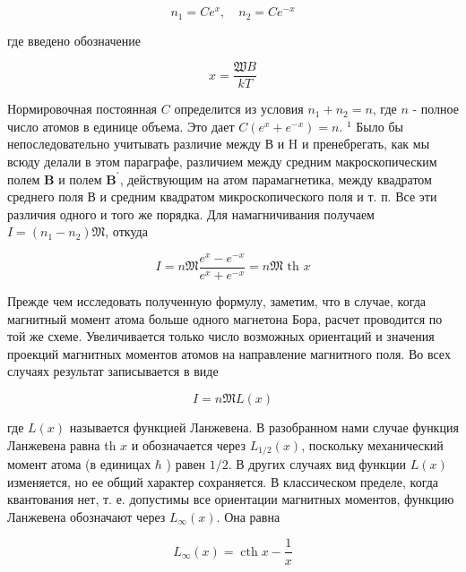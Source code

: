 \documentclass[12pt]{article}
\begin{document}
  \begin{equation}
  n_1=C e^x, \quad n_2=C e^{-x}
  \end{equation}

  где введено обозначение

  \begin{equation}
  x=\frac{\mathfrak{W} B}{k T}
  \end{equation}

  Нормировочная постоянная $C$ определится из условия $n_1+n_2=n$, где $n$ - полное число атомов в единице объема. Это дает $C\left(e^x+e^{-x}\right)=n$.
  ${ }^1$ Было бы непоследовательно учитывать различие между В и H и пренебрегать, как мы всюду делали в этом параграфе, различием между средним макроскопическим полем $\mathbf{B}$ и полем $\mathbf{B}^{\prime}$, действующим на атом парамагнетика, между квадратом среднего поля В и средним квадратом микроскопического поля и т. п. Все эти различия одного и того же порядка.
  Для намагничивания получаем $I=\left(n_1-n_2\right)\mathfrak{M}$, откуда

  \begin{equation}
  \label{eq:quantum}
  I=n \mathfrak{M} \frac{e^x-e^{-x}}{e^x+e^{-x}}=n \mathfrak{M} \text { th } x
  \end{equation}

  Прежде чем исследовать полученную формулу, заметим, что в случае, когда магнитный момент атома больше одного магнетона Бора, расчет проводится по той же схеме. Увеличивается только число возможных ориентаций и значения проекций магнитных моментов атомов на направление магнитного поля. Во всех случаях результат записывается в виде

  \begin{equation}
  I=n \mathfrak{M} L(x)
  \end{equation}

  где $L(x)$ называется функцией Ланжевена. В разобранном нами случае функция Ланжевена равна th $x$ и обозначается через $L_{1 / 2}(x)$, поскольку механический момент атома (в единицах $\hbar$ ) равен $1 / 2$. В других случаях вид функции $L(x)$ изменяется, но ее общий характер сохраняется. В классическом пределе, когда квантования нет, т. е. допустимы все ориентации магнитных моментов, функцию Ланжевена обозначают через $L_{\infty}(x)$. Она равна

  \begin{equation}
  \label{eq:lang}
  L_{\infty}(x)=\operatorname{cth} x-\frac{1}{x}
  \end{equation}
\end{document}
